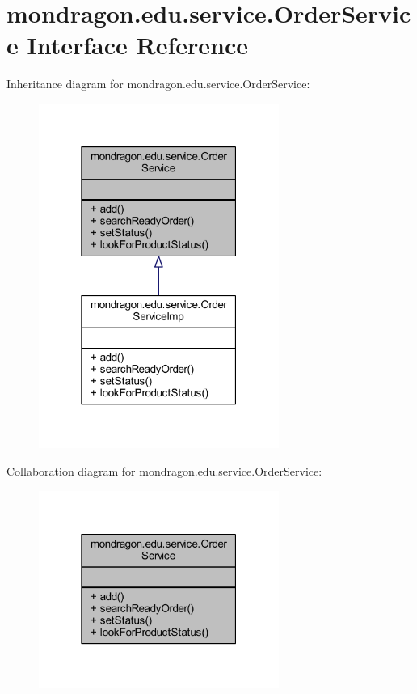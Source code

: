 \hypertarget{interfacemondragon_1_1edu_1_1service_1_1_order_service}{}\section{mondragon.\+edu.\+service.\+Order\+Service Interface Reference}
\label{interfacemondragon_1_1edu_1_1service_1_1_order_service}


Inheritance diagram for mondragon.\+edu.\+service.\+Order\+Service\+:\nopagebreak
\begin{figure}[H]
\begin{center}
\leavevmode
\includegraphics[width=223pt]{interfacemondragon_1_1edu_1_1service_1_1_order_service__inherit__graph}
\end{center}
\end{figure}


Collaboration diagram for mondragon.\+edu.\+service.\+Order\+Service\+:\nopagebreak
\begin{figure}[H]
\begin{center}
\leavevmode
\includegraphics[width=223pt]{interfacemondragon_1_1edu_1_1service_1_1_order_service__coll__graph}
\end{center}
\end{figure}
